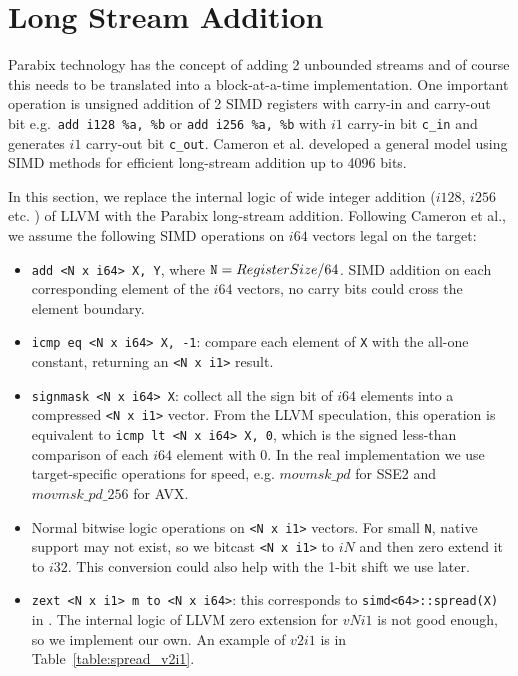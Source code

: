 \section{Long Stream Addition}
Parabix technology has the concept of adding 2 unbounded streams and of course this needs to be translated into a block-at-a-time implementation\cite{rob_regex}. One important operation is unsigned addition of 2 SIMD registers with carry-in and carry-out bit e.g.\ \verb|add i128 %a, %b| or \verb|add i256 %a, %b| with $i1$ carry-in bit \verb:c_in: and generates $i1$ carry-out bit \verb:c_out:. Cameron et al.\cite{rob_regex} developed a general model using SIMD methods for efficient long-stream addition up to 4096 bits.

In this section, we replace the internal logic of wide integer addition ($i128$, $i256$ etc. ) of LLVM with the Parabix long-stream addition. Following Cameron et al.\cite{rob_regex}, we assume the following SIMD operations on $i64$ vectors legal on the target:
\begin{itemize}
    \item \verb|add <N x i64> X, Y|, where $\text{\tt N} = RegisterSize / 64$. SIMD addition on each corresponding element of the $i64$ vectors, no carry bits could cross the element boundary.
    \item \verb|icmp eq <N x i64> X, -1|: compare each element of {\tt X} with the all-one constant, returning an \verb|<N x i1>| result.
    \item \verb|signmask <N x i64> X|: collect all the sign bit of $i64$ elements into a compressed \verb|<N x i1>| vector. From the LLVM speculation, this operation is equivalent to \verb|icmp lt <N x i64> X, 0|, which is the signed less-than comparison of each $i64$ element with 0. In the real implementation we use target-specific operations for speed, e.g. $movmsk\_pd$ for SSE2 and $movmsk\_pd\_256$ for AVX.
    \item Normal bitwise logic operations on \verb|<N x i1>| vectors. For small {\tt N}, native support may not exist, so we bitcast \verb|<N x i1>| to $iN$ and then zero extend it to $i32$. This conversion could also help with the 1-bit shift we use later.
    \item \verb|zext <N x i1> m to <N x i64>|: this corresponds to \verb|simd<64>::spread(X)| in \cite{rob_regex}. The internal logic of LLVM zero extension for $vNi1$ is not good enough, so we implement our own. An example of $v2i1$ is in Table~\ref{table:spread_v2i1}.
\end{itemize}

